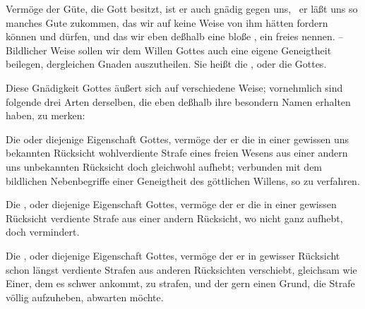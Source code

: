 \begin{aufza}
\item Vermöge der Güte, die Gott besitzt, ist er auch gnädig gegen uns, \dh\ er läßt uns so manches Gute zukommen, das wir auf keine Weise von ihm hätten fordern können und dürfen, und das wir eben deßhalb eine bloße , ein freies  nennen. -- Bildlicher Weise sollen wir dem Willen Gottes auch eine eigene Geneigtheit beilegen, dergleichen Gnaden auszutheilen. Sie heißt die , oder die  Gottes.
\item Diese Gnädigkeit Gottes äußert sich auf verschiedene Weise; vornehmlich sind folgende drei Arten derselben, die eben deßhalb ihre besondern Namen erhalten haben, zu merken:
\begin{aufzb}
\item Die  oder diejenige Eigenschaft Gottes, vermöge der er die in einer gewissen uns bekannten Rücksicht wohlverdiente Strafe eines freien Wesens aus einer andern uns unbekannten Rücksicht doch gleichwohl aufhebt; verbunden mit dem bildlichen Nebenbegriffe einer Geneigtheit des göttlichen Willens, so zu verfahren.
\item Die , oder diejenige Eigenschaft Gottes, vermöge der er die in einer gewissen Rücksicht verdiente Strafe aus einer andern Rücksicht, wo nicht ganz aufhebt, doch vermindert.
\item Die , oder diejenige Eigenschaft Gottes, vermöge der er in gewisser Rücksicht schon längst verdiente Strafen aus anderen Rücksichten verschiebt, gleichsam wie Einer, dem es schwer ankommt, zu strafen, und der gern einen Grund, die Strafe völlig aufzuheben, abwarten möchte.
\end{aufzb}
\end{aufza}

